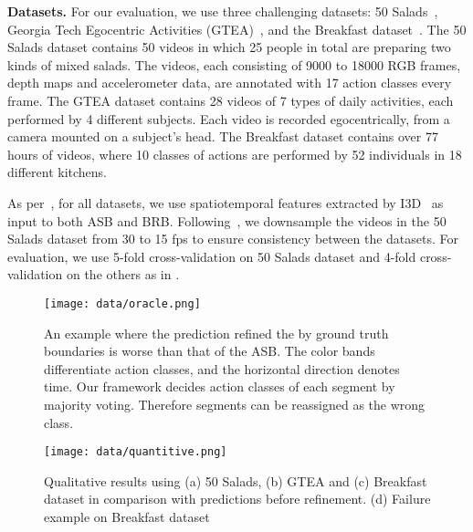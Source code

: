 \documentclass[10pt,twocolumn,letterpaper]{article}
\begin{document}
\textbf{Datasets.}
For our evaluation, we use three challenging datasets: 50 Salads~\cite{50salads}, Georgia Tech Egocentric
Activities (GTEA)~\cite{gtea}, and the Breakfast dataset~\cite{breakfast}.
The 50 Salads dataset contains 50 videos in which 25 people in total are preparing two kinds of mixed salads.
The videos, each consisting of 9000 to 18000 RGB frames, depth maps and accelerometer data, are annotated with 17 action classes every frame. 
The GTEA dataset contains 28 videos of 7 types of daily activities, each performed by 4 different subjects.
Each video is recorded egocentrically, from a camera mounted on a subject's head.
The Breakfast dataset contains over 77 hours of videos, where 10 classes of actions are performed by 52 individuals in 18 different kitchens.


As per~\cite{mstcn}, for all datasets, we use spatiotemporal features extracted by I3D~\cite{CarreiraCVPR2017} as input to both ASB and BRB.
Following~\cite{mstcn}, we downsample the videos in the 50 Salads dataset from 30 to 15 fps to ensure consistency between the datasets.
For evaluation, we use 5-fold cross-validation on 50 Salads dataset and 4-fold cross-validation on the others as in \cite{50salads,breakfast,mstcn}.


\begin{figure}[t!]
\begin{center}
\texttt{[image: data/oracle.png]}
\end{center}
\caption{An example where the prediction refined the by ground truth boundaries is worse than that of the ASB. 
The color bands differentiate action classes, and the horizontal direction denotes time.
Our framework decides action classes of each segment by majority voting. Therefore segments can be reassigned as the wrong class.}
\label{fig:oracle}
\vspace{-5pt}
\end{figure}


\begin{figure*}[t!]
\begin{center}
\texttt{[image: data/quantitive.png]}
\end{center}
\caption{Qualitative results using (a) 50 Salads, (b) GTEA and (c) Breakfast dataset in comparison with predictions before refinement. (d) Failure example on Breakfast dataset}
\label{fig:qualitative}
\vspace{-5pt}
\end{figure*}
\end{document}
